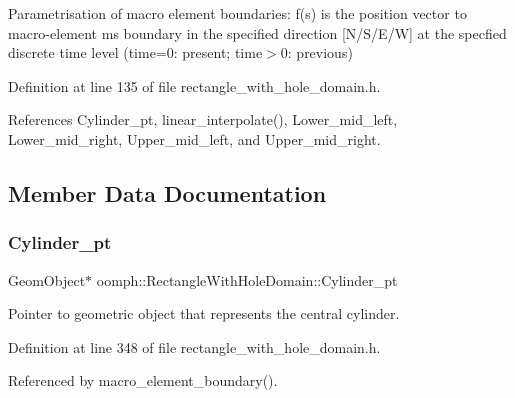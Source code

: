Parametrisation of macro element boundaries\+: f(s) is the position vector to macro-\/element m\textquotesingle{}s boundary in the specified direction \mbox{[}N/\+S/\+E/W\mbox{]} at the specfied discrete time level (time=0\+: present; time$>$0\+: previous) 



Definition at line 135 of file rectangle\+\_\+with\+\_\+hole\+\_\+domain.\+h.



References Cylinder\+\_\+pt, linear\+\_\+interpolate(), Lower\+\_\+mid\+\_\+left, Lower\+\_\+mid\+\_\+right, Upper\+\_\+mid\+\_\+left, and Upper\+\_\+mid\+\_\+right.



\subsection{Member Data Documentation}
\mbox{\label{classoomph_1_1RectangleWithHoleDomain_a4ca65e1f063e65c4254a594db66fabf8}} 
\subsubsection{\texorpdfstring{Cylinder\+\_\+pt}{Cylinder\_pt}}
{\footnotesize\ttfamily Geom\+Object$\ast$ oomph\+::\+Rectangle\+With\+Hole\+Domain\+::\+Cylinder\+\_\+pt\hspace{0.3cm}{\ttfamily [private]}}



Pointer to geometric object that represents the central cylinder. 



Definition at line 348 of file rectangle\+\_\+with\+\_\+hole\+\_\+domain.\+h.



Referenced by macro\+\_\+element\+\_\+boundary().

\mbox{\label{classoomph_1_1RectangleWithHoleDomain_a6926164244a3726aa904023c014e2cf0}} 
